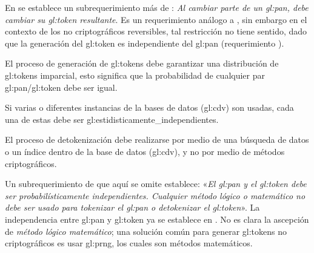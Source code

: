 En \cite{pci_tokens} se establece un subrequerimiento más de
: \textit{Al cambiar parte de un
\gls{gl:pan}, debe cambiar su \gls{gl:token} resultante}. Es un requerimiento
análogo a , sin embargo en el contexto
de los  no criptográficos reversibles, tal restricción no tiene sentido, dado
que  la generación del \gls{gl:token} es independiente del \gls{gl:pan}
(requerimiento ).

{
  El proceso de generación de \glspl{gl:token} debe garantizar una
  distribución de \glspl{gl:token} imparcial, esto significa que la
  probabilidad de cualquier par \gls{gl:pan}/\gls{gl:token} debe ser igual.
}

{
  Si varias o diferentes instancias de la bases de datos (\gls{gl:cdv}) son
  usadas, cada una de estas debe ser \glspl{gl:estidisticamente_independiente}.
}

{
  El proceso de detokenización debe realizarse por medio de una búsqueda de
  datos o un índice dentro de la base de datos (\gls{gl:cdv}), y no por medio
  de métodos criptográficos.

}

Un subrequerimiento de  que
aquí se omite establece: «\textit{El \gls{gl:pan} y el \gls{gl:token} debe ser
probabilísticamente independientes. Cualquier método lógico o matemático no
debe ser usado para \textit{tokenizar} el \gls{gl:pan} o \textit{detokenizar}
el \gls{gl:token}}». La independencia entre \gls{gl:pan} y \gls{gl:token} ya
se establece en . No es
clara la ascepción de \textit{método lógico matemático}; una solución
común para generar \glspl{gl:token} no criptográficos es usar \gls{gl:prng},
los cuales son métodos matemáticos.

